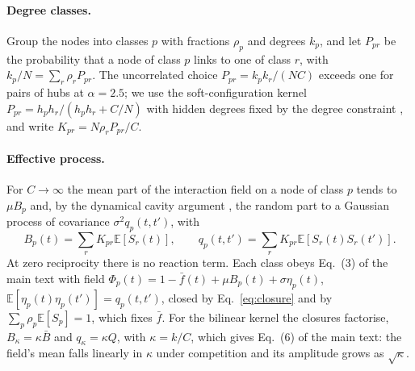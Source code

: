 \documentclass[pre,onecolumn,superscriptaddress,nofootinbib]{revtex4-2}
\newcommand{\E}{\mathbb E}
\begin{document}
\paragraph{Degree classes.}  Group the nodes into classes $p$ with fractions $\rho_p$ and degrees
$k_p$, and let $P_{pr}$ be the probability that a node of class $p$ links to one of class $r$, with
$k_p/N=\sum_r\rho_rP_{pr}$.  The uncorrelated choice $P_{pr}=k_pk_r/(NC)$ exceeds one for pairs of hubs
at $\alpha=2.5$; we use the soft-configuration kernel $P_{pr}=h_ph_r/(h_ph_r+C/N)$ with hidden degrees fixed
by the degree constraint \cite{patil2026}, and write $K_{pr}=N\rho_rP_{pr}/C$.

\paragraph{Effective process.}  For $C\to\infty$ the mean part of the interaction field on a node of
class $p$ tends to $\mu B_p$ and, by the dynamical cavity argument
\cite{bunin2017,galla2018,aguirrelopez}, the random part to a Gaussian process of covariance
$\sigma^2q_p(t,t')$, with
\begin{equation}
B_p(t)=\sum_rK_{pr}\E[S_r(t)],\qquad q_p(t,t')=\sum_rK_{pr}\E[S_r(t)S_r(t')] .
\label{eq:closure}
\end{equation}
At zero reciprocity there is no reaction term.  Each class obeys Eq.~(3) of the main text with field
$\Phi_p(t)=1-\bar f(t)+\mu B_p(t)+\sigma\eta_p(t)$, $\E[\eta_p(t)\eta_p(t')]=q_p(t,t')$, closed by
Eq.~\eqref{eq:closure} and by $\sum_p\rho_p\E[S_p]=1$, which fixes $\bar f$.  For the bilinear kernel the
closures factorise, $B_\kappa=\kappa\bar B$ and $q_\kappa=\kappa Q$, with $\kappa=k/C$, which gives Eq.~(6) of the
main text: the field's mean falls linearly in $\kappa$ under competition and its amplitude grows as
$\sqrt\kappa$.
\end{document}
